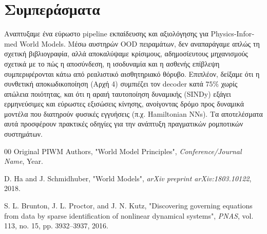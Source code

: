 \documentclass[conference, a4paper]{IEEEtran}
\begin{document}
\section{\textbf{Συμπεράσματα}}
\label{sec:conclusion}
Αναπτυξαμε ένα εύρωστο \textlatin{pipeline} εκπαίδευσης και αξιολόγησης για \textlatin{Physics-Informed World Models}. Μέσω αυστηρών \textlatin{OOD} πειραμάτων, δεν αναπαράγαμε απλώς τη σχετική βιβλιογραφία, αλλά αποκαλύψαμε κρίσιμους, αδημοσίευτους μηχανισμούς σχετικά με το πώς η αποσύνδεση, η ισοδυναμία και η ασθενής επίβλεψη συμπεριφέρονται κάτω από ρεαλιστικό αισθητηριακό θόρυβο. Επιπλέον, δείξαμε ότι η συνθετική αποκωδικοποίηση (Αρχή 4) συμπιέζει τον \textlatin{decoder} κατά $75\%$ χωρίς απώλεια ποιότητας, και ότι η αραιή ταυτοποίηση δυναμικής (\textlatin{SINDy}) εξάγει ερμηνεύσιμες και εύρωστες εξισώσεις κίνησης, ανοίγοντας δρόμο προς δυναμικά μοντέλα που διατηρούν φυσικές εγγυήσεις (π.χ. \textlatin{Hamiltonian NNs}). Τα αποτελέσματα αυτά προσφέρουν πρακτικές οδηγίες για την ανάπτυξη πραγματικών ρομποτικών συστημάτων.

\begin{thebibliography}{00}
Original PIWM Authors, "World Model Principles", \textit{Conference/Journal Name}, Year.

D. Ha and J. Schmidhuber, "World Models", \textit{arXiv preprint arXiv:1803.10122}, 2018.

S. L. Brunton, J. L. Proctor, and J. N. Kutz, "Discovering governing equations from data by sparse identification of nonlinear dynamical systems", \textit{PNAS}, vol. 113, no. 15, pp. 3932--3937, 2016.
\end{thebibliography}
\end{document}
